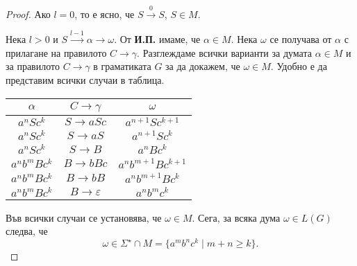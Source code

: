 \begin{proof}
  Ако $l = 0$, то е ясно, че $S \stackrel{0}{\rightarrow} S$, $S \in M$.

  Нека $l > 0$ и $S \stackrel{l-1}{\rightarrow} \alpha \rightarrow \omega$.
  От {\bf И.П.} имаме, че $\alpha \in M$. Нека $\omega$ се получава от $\alpha$ с прилагане на правилото $C \rightarrow \gamma$.
  Разглеждаме всички варианти за думата $\alpha \in M$ и за правилото $C\rightarrow \gamma$ в граматиката $G$
  за да докажем, че  $\omega \in M$.
  Удобно е да представим всички случаи в таблица.
  \begin{center}
    \begin{tabular}{| c | c | c |}
      \hline
      $\alpha$ & $C \rightarrow \gamma$ & $\omega$ \\ \hline
      $a^nSc^k$ & $S \rightarrow aSc$ & $a^{n+1}Sc^{k+1}$ \\ \hline
      $a^nSc^k$ & $S \rightarrow aS$ & $a^{n+1}Sc^{k}$ \\ \hline
      $a^nSc^k$ & $S \rightarrow B$ & $a^{n}Bc^{k}$ \\ \hline
      $a^nb^mBc^k$ & $B \rightarrow bBc$ & $a^nb^{m+1}Bc^{k+1}$\\ \hline
      $a^nb^mBc^k$ & $B \rightarrow bB$ & $a^nb^{m+1}Bc^{k}$\\ \hline
      $a^nb^mBc^k$ & $B \rightarrow \varepsilon$ & $a^nb^{m}c^{k}$\\ \hline
    \end{tabular}
  \end{center}
  Във всички случаи се установява, че $\omega \in M$.
  Сега, за всяка дума $\omega \in L(G)$ следва, че
  \[\omega \in \Sigma^\star \cap M = \{a^mb^nc^k\mid m+n \geq k\}.\]
\end{proof}



